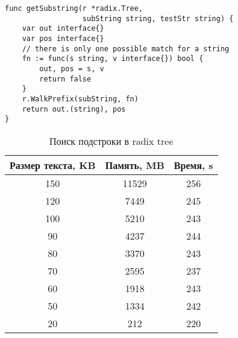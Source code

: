 \newpage
\begin{lstlisting}[caption=Radix tree lookup]
func getSubstring(r *radix.Tree,
                  subString string, testStr string) {
	var out interface{}
	var pos interface{}
	// there is only one possible match for a string
	fn := func(s string, v interface{}) bool {
		out, pos = s, v
		return false
	}
	r.WalkPrefix(subString, fn)
	return out.(string), pos
}
\end{lstlisting}


\begin{table}[h!]
    \centering
    \begin{tabular}{|c|c|c|}
        \hline
        Размер текста, KB & Память, MB & Время, s\\
        \hline
        150 & 11529 & 256\\
        \hline
        120 & 7449 & 245\\
        \hline
        100 & 5210 & 243\\
        \hline
        90 & 4237 & 244\\
        \hline
        80 & 3370 & 243\\
        \hline
        70 & 2595 & 237\\
        \hline
        60 & 1918 & 243\\
        \hline
        50 & 1334 & 242\\
        \hline
        20 & 212 & 220\\
        \hline
    \end{tabular}
    \caption{Поиск подстроки в radix tree}
    \label{table:5}
\end{table}
